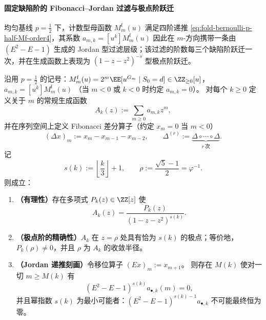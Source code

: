 \paragraph{固定缺陷阶的 Fibonacci--Jordan 过滤与极点阶跃迁}
均匀基线 \(p=\tfrac12\) 下，计数型母函数 \(M_m^{\mathrm f}(u)\) 满足四阶递推 \eqref{eq:fold-bernoulli-p-half-Mf-order4}，其系数 \(a_{m,k}=[u^k]M_m^{\mathrm f}(u)\) 因此在 \(m\)-方向携带一条由 \((E^2-E-1)\) 生成的 Jordan 型过滤层级；该过滤的阶数每三个缺陷阶跃迁一次，并在生成函数上表现为 \((1-z-z^2)^{-s}\) 型极点阶跃迁。

\begin{theorem}\label{thm:fold-bernoulli-half-fixed-defect-fibonacci-jordan-filter}
沿用 \(p=\tfrac12\) 的记号：\(M_m^{\mathrm f}(u)=2^m\EE[u^{G_m}\mid S_0=d]\in\ZZ_{\ge 0}[u]\)，
\(
a_{m,k}=[u^k]M_m^{\mathrm f}(u)
\)
（当 \(m<0\) 或 \(k<0\) 时约定 \(a_{m,k}=0\)）。
对每个 \(k\ge 0\) 定义关于 \(m\) 的常规生成函数
\[
A_k(z):=\sum_{m\ge 0}a_{m,k}z^m,
\]
并在序列空间上定义 Fibonacci 差分算子（约定 \(x_m=0\) 当 \(m<0\)）
\[
(\Delta x)_m:=x_m-x_{m-1}-x_{m-2},\qquad \Delta^{(r)}:=\underbrace{\Delta\circ\cdots\circ\Delta}_{r\ \text{次}}.
\]
记
\[
s(k):=\left\lfloor \frac{k}{3}\right\rfloor+1,
\qquad
\rho:=\frac{\sqrt5-1}{2}=\varphi^{-1}.
\]
则成立：
\begin{enumerate}
  \item \textbf{（有理性）}存在多项式 \(P_k(z)\in\ZZ[z]\) 使
  \[
  A_k(z)=\frac{P_k(z)}{(1-z-z^2)^{s(k)}}.
  \]
  \item \textbf{（极点阶的精确性）}\(A_k\) 在 \(z=\rho\) 处具有恰为 \(s(k)\) 的极点；等价地，\(P_k(\rho)\neq 0\)，并且 \(\rho\) 为 \(A_k\) 的收敛半径。
  \item \textbf{（Jordan 递推刻画）}令移位算子 \((Ex)_m:=x_{m+1}\)。
  则存在 \(M(k)\) 使对一切 \(m\ge M(k)\) 有
  \[
  (E^2-E-1)^{s(k)}a_{\bullet,k}(m)=0,
  \]
  并且幂指数 \(s(k)\) 为最小可能者：\((E^2-E-1)^{s(k)-1}a_{\bullet,k}\) 不可能最终恒为零。
\end{enumerate}
\end{theorem}
